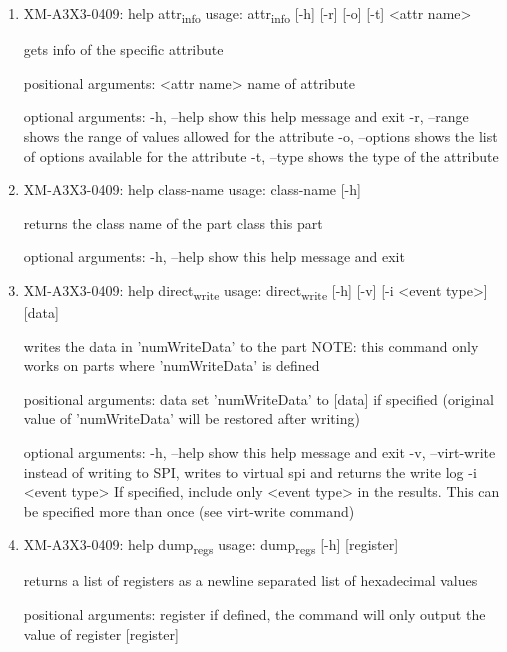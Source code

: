 \documentclass[11pt]{article}
\begin{document}
\begin{enumerate}
\item XM-A3X3-0409: help attr\textsubscript{info}
\label{sec:org13d581b}
usage: attr\textsubscript{info} [-h] [-r] [-o] [-t] <attr name>

gets info of the specific attribute

positional arguments:
  <attr name>    name of attribute

optional arguments:
  -h, --help     show this help message and exit
  -r, --range    shows the range of values allowed for the attribute
  -o, --options  shows the list of options available for the attribute
  -t, --type     shows the type of the attribute

\item XM-A3X3-0409: help class-name
\label{sec:org51f39f3}
usage: class-name [-h]

returns the class name of the part class this part

optional arguments:
  -h, --help  show this help message and exit

\item XM-A3X3-0409: help direct\textsubscript{write}
\label{sec:orge11a475}
usage: direct\textsubscript{write} [-h] [-v] [-i <event type>] [data]

writes the data in 'numWriteData' to the part NOTE: this command only works on
parts where 'numWriteData' is defined

positional arguments:
  data              set 'numWriteData' to [data] if specified (original value
                    of 'numWriteData' will be restored after writing)

optional arguments:
  -h, --help        show this help message and exit
  -v, --virt-write  instead of writing to SPI, writes to virtual spi and
                    returns the write log
  -i <event type>   If specified, include only <event type> in the results.
                    This can be specified more than once (see virt-write
                    command)

\item XM-A3X3-0409: help dump\textsubscript{regs}
\label{sec:org1184bc4}
usage: dump\textsubscript{regs} [-h] [register]

returns a list of registers as a newline separated list of hexadecimal values

positional arguments:
  register    if defined, the command will only output the value of register
              [register]


\end{enumerate}
\end{document}
